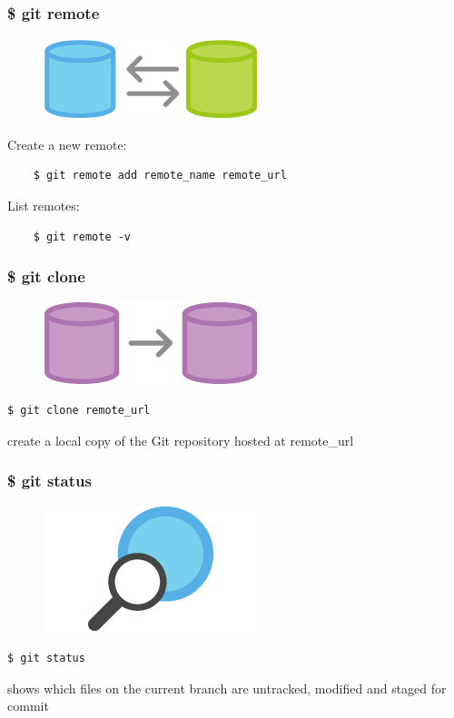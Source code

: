 \documentclass{beamer}
\begin{document}
\begin{frame}[fragile]
    \frametitle{\$ git remote}
    \begin{figure}[h!]
        \begin{center}
            \includegraphics[scale=0.7]{remote.png}
        \end{center}
    \end{figure}
    Create a new remote:
    \begin{verbatim}
    $ git remote add remote_name remote_url
    \end{verbatim}
    List remotes:
    \begin{verbatim}
    $ git remote -v
    \end{verbatim}
\end{frame}

\begin{frame}[fragile]
    \frametitle{\$ git clone}
    \begin{figure}[h!]
        \begin{center}
            \includegraphics[scale=0.7]{clone.png}
        \end{center}
    \end{figure}
    \begin{verbatim}
$ git clone remote_url
    \end{verbatim}
    create a local copy of the Git repository hosted at remote\_url
\end{frame}

\begin{frame}[fragile]
    \frametitle{\$ git status}
    \begin{figure}[h!]
        \begin{center}
            \includegraphics[scale=0.7]{status.png}
        \end{center}
    \end{figure}
    \begin{verbatim}
$ git status
    \end{verbatim}
    shows which files on the current branch are untracked, modified and staged for commit
\end{frame}
\end{document}

